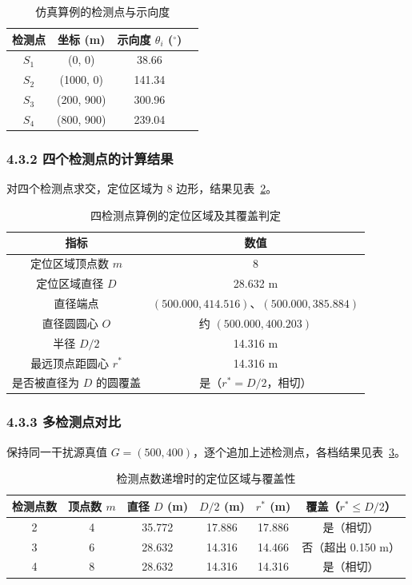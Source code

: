 \documentclass[UTF8, zihao=5,AutoFakeBold=2]{ctexart}
\begin{document}
	\begin{table}[H]
		\centering
		\caption{仿真算例的检测点与示向度}
		\label{tab:p1-bearing}
		\begin{tabular}{cccc}
			\toprule
			检测点 & 坐标 (m) & 示向度 \(\theta_i\) (\(^\circ\)) \\
			\midrule
			\(S_1\) & (0, 0) & 38.66 \\
			\(S_2\) & (1000, 0) & 141.34 \\
			\(S_3\) & (200, 900) & 300.96 \\
			\(S_4\) & (800, 900) & 239.04 \\
			\bottomrule
		\end{tabular}
	\end{table}

	\subsubsection*{4.3.2 四个检测点的计算结果}

	对四个检测点求交，定位区域为 8 边形，结果见表~\ref{tab:p1-four}。

	\begin{table}[H]
		\centering
		\caption{四检测点算例的定位区域及其覆盖判定}
		\label{tab:p1-four}
		\begin{tabular}{cc}
			\toprule
			指标 & 数值 \\
			\midrule
			定位区域顶点数 \(m\) & 8 \\
			定位区域直径 \(D\) & 28.632 m \\
			直径端点 & \((500.000,414.516)\)、\((500.000,385.884)\) \\
			直径圆圆心 \(O\) & 约 \((500.000,400.203)\) \\
			半径 \(D/2\) & 14.316 m \\
			最远顶点距圆心 \(r^*\) & 14.316 m \\
			是否被直径为 \(D\) 的圆覆盖 & 是（\(r^*=D/2\)，相切） \\
			\bottomrule
		\end{tabular}
	\end{table}

	\subsubsection*{4.3.3 多检测点对比}

	保持同一干扰源真值 \(G=(500,400)\)，逐个追加上述检测点，各档结果见表~\ref{tab:p1-compare}。

	\begin{table}[H]
		\centering
		\caption{检测点数递增时的定位区域与覆盖性}
		\label{tab:p1-compare}
		\begin{tabular}{cccccc}
			\toprule
			检测点数 & 顶点数 \(m\) & 直径 \(D\) (m) & \(D/2\) (m) & \(r^*\) (m) & 覆盖（\(r^*\le D/2\)） \\
			\midrule
			2 & 4 & 35.772 & 17.886 & 17.886 & 是（相切） \\
			3 & 6 & 28.632 & 14.316 & 14.466 & 否（超出 0.150 m） \\
			4 & 8 & 28.632 & 14.316 & 14.316 & 是（相切） \\
			\bottomrule
		\end{tabular}
	\end{table}
\end{document}
